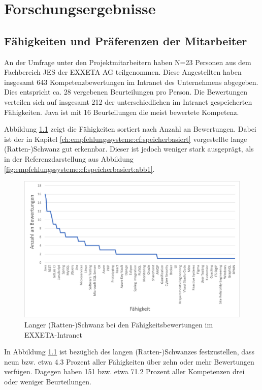 \chapter{Forschungsergebnisse}
\label{ch:ergebnisse}

\section{Fähigkeiten und Präferenzen der Mitarbeiter}
\label{ch:ergebnisse:analyse}
An der Umfrage unter den Projektmitarbeitern haben N=23 Personen aus dem Fachbereich \acl{JES} der EXXETA AG teilgenommen. Diese Angestellten haben insgesamt 643 Kompetenzbewertungen im Intranet des Unternehmens abgegeben. Dies entspricht ca. 28 vergebenen Beurteilungen pro Person. Die Bewertungen verteilen sich auf insgesamt 212 der \anzFaehigkeiten unterschiedlichen im Intranet gespeicherten Fähigkeiten. Java ist mit 16 Beurteilungen die meist bewertete Kompetenz.

Abbildung \ref{fig:ergebnisse:analyse:abb1} zeigt die Fähigkeiten sortiert nach Anzahl an Bewertungen. Dabei ist der in Kapitel \ref{ch:empfehlungssysteme:cf:speicherbasiert} vorgestellte lange (Ratten-)Schwanz gut erkennbar. Dieser ist jedoch weniger stark ausgeprägt, als in der Referenzdarstellung aus Abbildung \ref{fig:empfehlungssysteme:cf:speicherbasiert:abb1}.

\begin{figure}[h]
	\centering
	\includegraphics[width=1\textwidth]{gfx/long-tail-intranet.png}
	\caption{Langer (Ratten-)Schwanz bei den Fähigkeitsbewertungen im EXXETA-Intranet}
	\label{fig:ergebnisse:analyse:abb1}
\end{figure}

In Abbildung \ref{fig:ergebnisse:analyse:abb1} ist bezüglich des langen (Ratten-)Schwanzes festzustellen, dass neun bzw. etwa 4.3 Prozent aller Fähigkeiten über zehn oder mehr Bewertungen verfügen. Dagegen haben 151 bzw. etwa 71.2 Prozent aller Kompetenzen drei oder weniger Beurteilungen.

